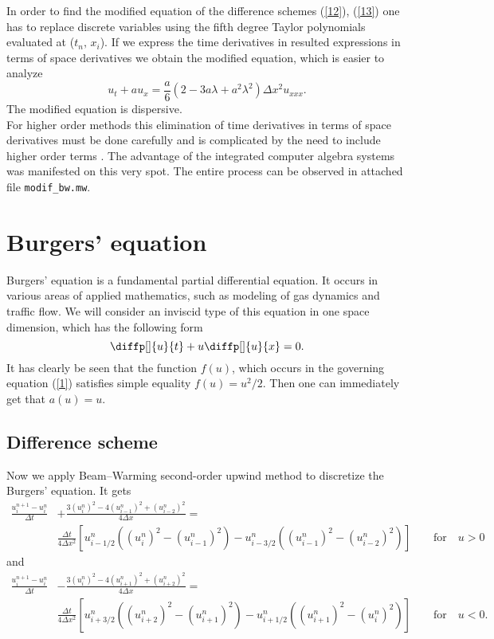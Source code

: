 \documentclass[a4paper, 10pt]{article}
\begin{document}
In order to find the modified equation of the difference schemes (\ref{12}), (\ref{13}) one has to replace discrete variables using the fifth degree Taylor polynomials evaluated at ($t_n,\, x_i$). If we express the time derivatives in resulted expressions in terms of space derivatives we obtain the modified equation, which is easier to analyze
\begin{equation}
\label{x}
u_t + a u_x = \frac{a}{6}\left(2 - 3 a \lambda + a^2 \lambda^2 \right) \Delta x^2 u_{xxx}.
\end{equation}
The modified equation is dispersive.\\

For higher order methods this elimination of time derivatives in terms of space derivatives must be done carefully and is complicated by the need to include higher order terms \cite{strikwerda}. The advantage of the integrated computer algebra systems was manifested on this very spot. The entire process can be observed in attached file \texttt{modif\_bw.mw}.

\section{Burgers' equation}
Burgers' equation is a fundamental partial differential equation. It occurs in various areas of applied mathematics, such as modeling of gas dynamics and traffic flow. We will consider an inviscid type of this equation in one space dimension, which has the following form \cite{leveque}
\begin{equation}
\diffp[]{u}{t} + u \diffp[]{u}{x} = 0.
\end{equation}
It has clearly be seen that the function $ f(u) $, which occurs in the governing equation (\ref{1}) satisfies simple equality $ f(u) = u^2/2 $. Then one can immediately get that $ a(u) = u $.
\subsection{Difference scheme}
Now we apply Beam--Warming second-order upwind method to discretize the Burgers' equation. It gets
\begin{equation}
\begin{split}
\frac{u_i^{n+1} - u_i^n}{\Delta t} & + \frac{3(u_i^n)^2 - 4(u_{i-1}^n)^2 + (u_{i-2}^n)^2}{4 \Delta x} = \\
& \frac{\Delta t}{4 \Delta x^2} \left[ u_{i-1/2}^n \left( (u_{i}^n)^2 - (u_{i-1}^n)^2 \right) - u_{i-3/2}^n \left( (u_{i-1}^n)^2 - (u_{i-2}^n)^2 \right) \right] \qquad \mathrm{for} \quad u > 0
\end{split}
\end{equation}
and
\begin{equation}
\begin{split}
\frac{u_i^{n+1} - u_i^n}{\Delta t} & - \frac{3(u_i^n)^2 - 4(u_{i+1}^n)^2 + (u_{i+2}^n)^2}{4 \Delta x} = \\
& \frac{\Delta t}{4 \Delta x^2} \left[ u_{i+3/2}^n \left( (u_{i+2}^n)^2 - (u_{i+1}^n)^2 \right) - u_{i+1/2}^n \left( (u_{i+1}^n)^2 - (u_{i}^n)^2 \right) \right] \qquad \mathrm{for} \quad u < 0.
\end{split}
\end{equation}
\end{document}
